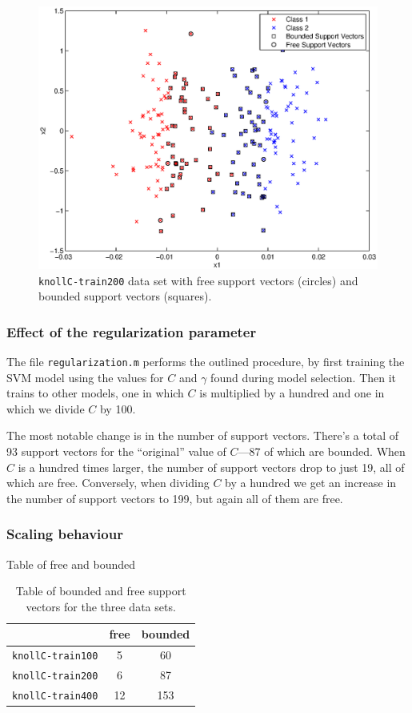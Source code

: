 \documentclass{article}
\begin{document}
\begin{figure}[!ht]
  \centering
  \includegraphics[width=.8\textwidth]{Code/freeBoundedSVs.eps}
  \caption{\texttt{knollC-train200} data set with free support vectors (circles) and bounded support vectors (squares).}
  \label{fig:freebounded}
\end{figure}

\subsubsection{Effect of the regularization parameter}


The file \texttt{regularization.m} performs the outlined procedure, by first training the SVM model using the values for $C$ and $\gamma$ found during model selection. Then it trains to other models, one in which $C$ is multiplied by a hundred and one in which we divide $C$ by 100.

The most notable change is in the number of support vectors. There's a total of 93 support vectors for the ``original'' value of $C$---87 of which are bounded. When $C$ is a hundred times larger, the number of support vectors drop to just 19, all of which are free. Conversely, when dividing $C$ by a hundred we get an increase in the number of support vectors to 199, but again all of them are free.

\subsubsection{Scaling behaviour}

Table of free and bounded 

\begin{table}[h!]
  \centering
  \begin{tabular}{l | c | c}
    \hfill & free & bounded\\\hline
    \texttt{knollC-train100} & 5 & 60 \\
    \texttt{knollC-train200} & 6 & 87 \\
    \texttt{knollC-train400} & 12 & 153 \\
  \end{tabular}
  \caption{Table of bounded and free support vectors for the three data sets.}
  \label{tab:knoll_free_bounded_SV}
\end{table}
\end{document}
